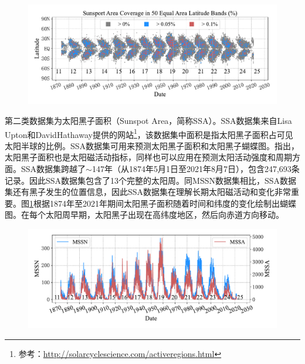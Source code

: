 \begin{figure}[!htbp]
  \vspace{-0.3cm}
  \centering
  \includegraphics[width=\textwidth]{Img/chap3_ss/ss_butterfly.pdf}
  \vspace{-1.4cm}
  \label{fig:ss_butterfly}
\end{figure}

第二类数据集为太阳黑子面积（Sunspot Area，简称SSA）。SSA数据集来自Lisa Upton和DavidHathaway提供的网站\footnote{参考：\href{http://solarcyclescience.com/activeregions.html}{http://solarcyclescience.com/activeregions.html}}，该数据集中面积是指太阳黑子面积占可见太阳半球的比例。SSA数据集可用来预测太阳黑子面积和太阳黑子蝴蝶图。\citet{hathaway2015solar}指出，太阳黑子面积也是太阳磁活动指标，同样也可以应用在预测太阳活动强度和周期方面。SSA数据集跨越了$\sim$147年（从1874年5月1日至2021年8月7日），包含247,693条记录。因此SSA数据集包含了13个完整的太阳周。同MSSN数据集相比，SSA数据集还有黑子发生的位置信息，因此SSA数据集在理解长期太阳磁活动和变化非常重要。图\ref{fig:ss_butterfly}根据1874年至2021年期间太阳黑子面积随着时间和纬度的变化绘制出蝴蝶图。在每个太阳周早期，太阳黑子出现在高纬度地区，然后向赤道方向移动。

\begin{figure}[!htbp]
  \vspace{-0.3cm}
  \centering
  \includegraphics[width=\textwidth]{Img/chap3_ss/ss_number_area.pdf}
  \vspace{-1.4cm}
  \label{fig:ss_number_area}
\end{figure}

